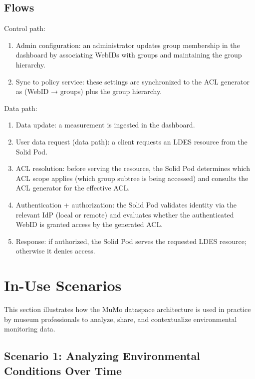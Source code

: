 \documentclass{ceurart}
\providecommand{\tightlist}{%
  \setlength{\itemsep}{0pt}\setlength{\parskip}{0pt}}
\begin{document}
\subsection{Flows}\label{flows}

Control path:

\begin{enumerate}
\def\labelenumi{\arabic{enumi}.}
\tightlist
\item
  Admin configuration: an administrator updates group membership in the
  dashboard by associating WebIDs with groups and maintaining the group
  hierarchy.
\item
  Sync to policy service: these settings are synchronized to the ACL
  generator as (WebID → groups) plus the group hierarchy.
\end{enumerate}

Data path:

\begin{enumerate}
\def\labelenumi{\arabic{enumi}.}
\tightlist
\item
  Data update: a measurement is ingested in the dashboard.
\item
  User data request (data path): a client requests an LDES resource from
  the Solid Pod.
\item
  ACL resolution: before serving the resource, the Solid Pod determines
  which ACL scope applies (which group subtree is being accessed) and
  consults the ACL generator for the effective ACL.
\item
  Authentication + authorization: the Solid Pod validates identity via
  the relevant IdP (local or remote) and evaluates whether the
  authenticated WebID is granted access by the generated ACL.
\item
  Response: if authorized, the Solid Pod serves the requested LDES
  resource; otherwise it denies access.
\end{enumerate}

\section{In-Use Scenarios}\label{sec:scenarios}

This section illustrates how the MuMo dataspace architecture is used in
practice by museum professionals to analyze, share, and contextualize
environmental monitoring data.

\subsection{Scenario 1: Analyzing Environmental Conditions Over
Time}\label{scenario-1-analyzing-environmental-conditions-over-time}
\end{document}
